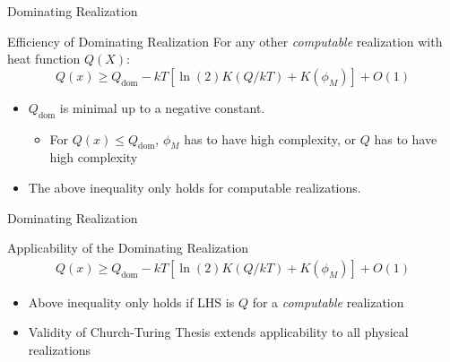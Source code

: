 \begin{frame}{Dominating Realization}
\begin{block}{Efficiency of Dominating Realization}
    For any other \textit{computable} realization with heat function $Q(X)$:
    \begin{equation*}
        Q(x) \ge Q_\text{dom} - kT\left[\ln(2)K(Q/kT) + K(\phi_M)\right] + O(1)
    \end{equation*}
    \begin{itemize}
        \item $Q_\text{dom}$ is minimal up to a negative constant. 
        \begin{itemize}
            \item For $Q(x) \le Q_\text{dom}$, $\phi_M$ has to have high complexity, or $Q$ has to have high complexity
        \end{itemize}
        \item The above inequality only holds for computable realizations. 
    \end{itemize}
\end{block}
\end{frame}

\begin{frame}{Dominating Realization}
\begin{block}{Applicability of the Dominating Realization}
	\begin{align*}
        Q(x) \ge Q_\text{dom} - kT\left[\ln(2)K(Q/kT) + K(\phi_M)\right] + O(1)
    \end{align*}
    \begin{itemize}
    	\item Above inequality only holds if LHS is $Q$ for a \textit{computable} realization
    	\item Validity of Church-Turing Thesis extends applicability to all physical realizations
    \end{itemize}
\end{block}
\end{frame}

